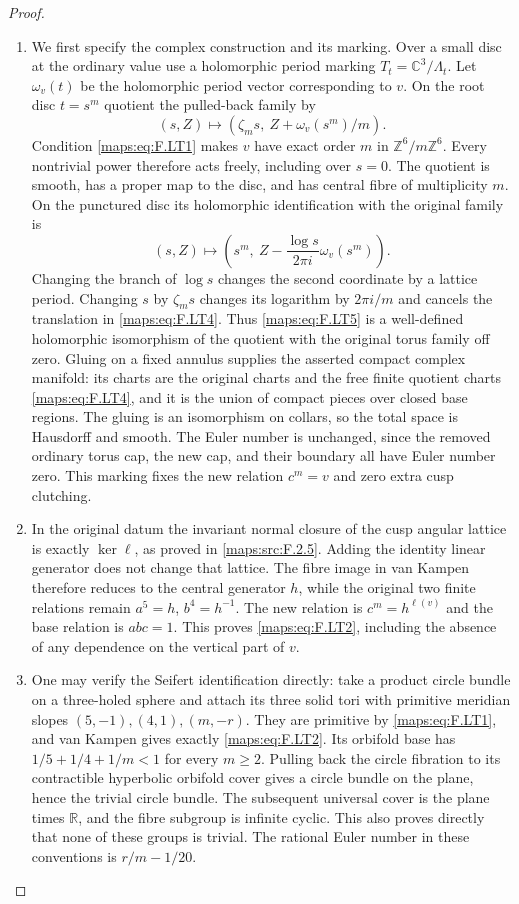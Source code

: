 \documentclass[11pt,a4paper]{article}
\theoremstyle{definition}
\begin{document}
\begin{proof}
\begin{enumerate}[label=\arabic*.]
\item We first specify the complex construction and its marking.
Over a small disc at the ordinary value use a holomorphic
period marking
$T_t=\mathbb C^3/\Lambda_t$.
Let $\omega_v(t)$ be the holomorphic period vector
corresponding to $v$.
On the root disc $t=s^m$ quotient the pulled-back family by
\[
 (s,Z)\longmapsto
   (\zeta_m s,\ Z+\omega_v(s^m)/m).
\tag{F.LT4}\label{maps:eq:F.LT4}
\]
Condition \eqref{maps:eq:F.LT1} makes $v$ have exact order $m$
in $\mathbb Z^6/m\mathbb Z^6$.
Every nontrivial power therefore acts freely, including
over $s=0$.
The quotient is smooth, has a proper map to the disc,
and has central fibre of multiplicity $m$.
On the punctured disc its holomorphic identification with
the original family is
\[
 (s,Z)\longmapsto
 \left(s^m,\ Z-\frac{\log s}{2\pi i}\omega_v(s^m)\right).
\tag{F.LT5}\label{maps:eq:F.LT5}
\]
Changing the branch of $\log s$ changes the second
coordinate by a lattice period.
Changing $s$ by $\zeta_m s$ changes its logarithm by
$2\pi i/m$ and cancels the translation in \eqref{maps:eq:F.LT4}.
Thus \eqref{maps:eq:F.LT5} is a well-defined holomorphic isomorphism
of the quotient with the original torus family off zero.
Gluing on a fixed annulus supplies the asserted compact
complex manifold: its charts are the original charts
and the free finite quotient charts \eqref{maps:eq:F.LT4}, and it is
the union of compact pieces over closed base regions.
The gluing is an isomorphism on collars, so the total
space is Hausdorff and smooth.
The Euler number is unchanged, since the removed
ordinary torus cap, the new cap, and their boundary
all have Euler number zero.
This marking fixes the new relation $c^m=v$ and
zero extra cusp clutching.

\item In the original datum the invariant normal closure
of the cusp angular lattice is exactly $\ker\ell$,
as proved in \ref{maps:src:F.2.5}.
Adding the identity linear generator does not change
that lattice.
The fibre image in van Kampen therefore reduces to
the central generator $h$, while the original two
finite relations remain $a^5=h$, $b^4=h^{-1}$.
The new relation is $c^m=h^{\ell(v)}$ and the base
relation is $abc=1$.
This proves \eqref{maps:eq:F.LT2}, including the absence of any
dependence on the vertical part of $v$.

\item One may verify the Seifert identification directly:
take a product circle bundle on a three-holed sphere
and attach its three solid tori with primitive meridian
slopes $(5,-1),(4,1),(m,-r)$.
They are primitive by \eqref{maps:eq:F.LT1}, and van Kampen gives
exactly \eqref{maps:eq:F.LT2}.
Its orbifold base has
$1/5+1/4+1/m<1$ for every $m\ge2$.
Pulling back the circle fibration to its contractible
hyperbolic orbifold cover gives a circle bundle on
the plane, hence the trivial circle bundle.
The subsequent universal cover is the plane times
$\mathbb R$, and the fibre subgroup is infinite cyclic.
This also proves directly that none of these groups
is trivial.
The rational Euler number in these conventions is
$r/m-1/20$.


\end{enumerate}
\end{proof}
\end{document}
